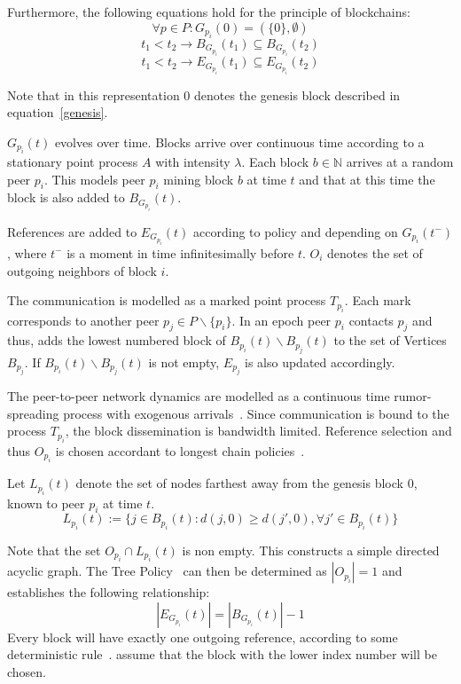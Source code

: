 Furthermore, the following equations hold for the principle of blockchains:
\begin{equation}
\forall p \in P: G_{p_i}(0) = (\{0\},\emptyset)
\label{genesis}
\end{equation}
\begin{equation}
t_1 < t_2 \rightarrow B_{G_{p_i}}(t_1) \subseteq B_{G_{p_i}}(t_2)
\label{nodegrow}
\end{equation}
\begin{equation}
t_1 < t_2 \rightarrow E_{G_{p_i}}(t_1) \subseteq E_{G_{p_i}}(t_2)
\label{edgegrow}
\end{equation}

Note that in this representation $0$ denotes the genesis block described in equation~\ref{genesis}.

$G_{p_i}(t)$ evolves over time. Blocks arrive over continuous time according to a stationary point process $A$ with intensity $\lambda$. Each block $b \in \mathbb{N}$ arrives at a random peer $p_i$.
This models peer $p_i$ mining block $b$ at time $t$ and that at this time the block is also added to $B_{G_{p_i}}(t)$.

References are added to $E_{G_{p_i}}(t)$ according to policy and depending on $G_{p_i}(t^-)$, where $t^-$ is a moment in time infinitesimally before $t$. $O_i$ denotes the set of outgoing neighbors of block $i$.

The communication is modelled as a marked point process $T_{p_i}$.
Each mark corresponds to another peer $p_j \in P\backslash \{p_i\}$.
In an epoch peer $p_i$ contacts $p_j$ and thus, adds the lowest numbered block of $B_{p_i}(t)\backslash B_{p_j}(t)$ to the set of Vertices $B_{p_j}$. If $B_{p_i}(t)\backslash B_{p_j}(t)$ is not empty, $E_{p_j}$ is also updated accordingly.

The peer-to-peer network dynamics are modelled as a continuous time rumor-spreading process with exogenous arrivals~\citep{gopalan}. Since communication is bound to the process $T_{p_i}$, the block dissemination is bandwidth limited.
Reference selection and thus $O_{p_i}$ is chosen accordant to longest chain policies~\citep{gopalan}.

Let $L_{p_i}(t)$ denote the set of nodes farthest away from the genesis block $0$, known to peer $p_i$ at time $t$.
\begin{equation}
L_{p_i}(t) := \{j \in B_{p_i}(t): d(j,0)\geq d(j',0), \forall j' \in B_{p_i}(t) \}
\label{policy}
\end{equation}

Note that the set $O_{p_i} \cap L_{p_i}(t)$ is non empty. This constructs a simple directed acyclic graph. The Tree Policy~\citep{gopalan} can then be determined as $|O_{p_i}|=1$ and establishes the following relationship:
\begin{equation}
|E_{G_{p_i}}(t)| = |B_{G_{p_i}}(t)| -1
\end{equation}
Every block will have exactly one outgoing reference, according to some deterministic rule~\citep{gopalan}. \citeauthor{gopalan} assume that the block with the lower index number will be chosen.


